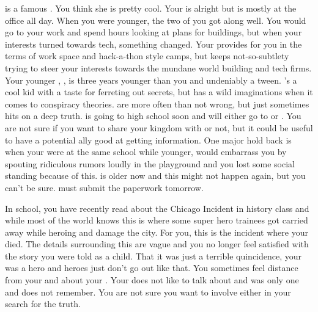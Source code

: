 \documentclass[char]{LRSguildcamp1}
\begin{document}
\cGrandma{} is a famous \cGrandma{\villain}. You think she is pretty cool. Your \cArchitect{\parent} is alright but is mostly at the office all day. When you were younger, the two of you got along well. You would go to your \cArchitect{\parent} work and spend hours looking at plans for buildings, but when your interests turned towards tech, something changed. Your \cArchitect{\parent} provides for you in the terms of work space and hack-a-thon style camps, but keeps not-so-subtlety trying to steer your interests towards the mundane world building and tech firms. Your younger \cTween{\sibling}, \cTween{}, is three years younger than you and undeniably a tween. \cTween{}'s a cool kid with a taste for ferreting out secrets, but has a wild imaginations when it comes to conspiracy theories. \cTween{\They} are more often than not wrong, but just sometimes hits on a deep truth. \cTween{} is going to high school soon and will either go to \pNormalSchool{} or \pSuperSchool{}. You are not sure if you want to share your kingdom with \cTween{\them} or not, but it could be useful to have a potential ally good at getting information. One major hold back is when your were at the same school while younger, \cTween{} would embarrass you by spouting ridiculous rumors loudly in the playground and you lost some social standing because of this. \cTween{} is older now and this might not happen again, but you can't be sure. \cTween{} must submit the paperwork tomorrow.

In school, you have recently read about the Chicago Incident in history class and while most of the world knows this is where some super hero trainees got carried away while heroing and damage the city. For you, this is the incident where your \cAS{\parent} died. The details surrounding this are vague and you no longer feel satisfied with the story you were told as a child. That it was just a terrible quincidence, your \cAS{} was a hero and heroes just don't go out like that. You sometimes feel distance from your\cArchitect{\parent} and \cTween{} about your \cAS{\parent}. Your \cArchitect{\parent} does not like to talk about \cAS{} and \cTween{} was only one and does not remember. You are not sure you want to involve either in your search for the truth.
\end{document}
